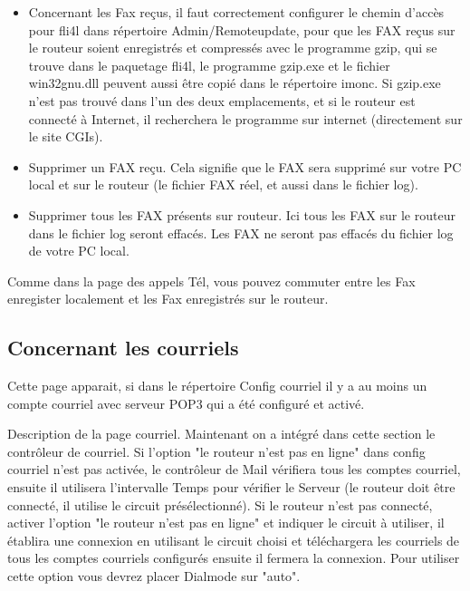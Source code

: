   \begin{itemize}
  \item Concernant les Fax reçus, il faut correctement configurer le chemin
  d'accès pour fli4l dans répertoire Admin/Remoteupdate, pour que les FAX
  reçus sur le routeur soient enregistrés et compressés avec le programme
  gzip, qui se trouve dans le paquetage fli4l, le programme gzip.exe et le
  fichier win32gnu.dll peuvent aussi être copié dans le répertoire imonc.
  Si gzip.exe n'est pas trouvé dans l'un des deux emplacements, et si le
  routeur est connecté à Internet, il recherchera le programme sur internet
  (directement sur le site CGIs).
  \item Supprimer un FAX reçu. Cela signifie que le FAX sera supprimé sur
    votre PC local et sur le routeur (le fichier FAX réel, et aussi dans
    le fichier log).
  \item Supprimer tous les FAX présents sur routeur. Ici tous les FAX
    sur le routeur dans le fichier log seront effacés. Les FAX ne seront
    pas effacés du fichier log de votre PC local.
  \end{itemize}

  Comme dans la page des appels Tél, vous pouvez commuter entre les Fax
  enregister localement et les Fax enregistrés sur le routeur.

  \subsection{Concernant les courriels}

  Cette page apparait, si dans le répertoire Config courriel il y a au moins
  un compte \mbox{courriel} avec serveur POP3 qui a été configuré et activé.

  Description de la page \mbox{courriel}. Maintenant on a intégré dans cette section
  le contrôleur de \mbox{courriel}. Si l'option "le routeur n'est pas en ligne" dans
  config \mbox{courriel} n'est pas activée, le contrôleur de Mail vérifiera tous les
  comptes \mbox{courriel}, ensuite il utilisera l'intervalle Temps pour vérifier le
  Serveur (le routeur doit être connecté, il utilise le circuit
  présélectionné). Si le routeur n'est pas connecté, activer l'option "le
  routeur n'est pas en ligne" et indiquer le circuit à utiliser, il établira
  une connexion en utilisant le circuit choisi et téléchargera les \mbox{courriels} de
  tous les comptes \mbox{courriels} configurés ensuite il fermera la connexion. Pour
  utiliser cette option vous devrez placer Dialmode sur "auto".

